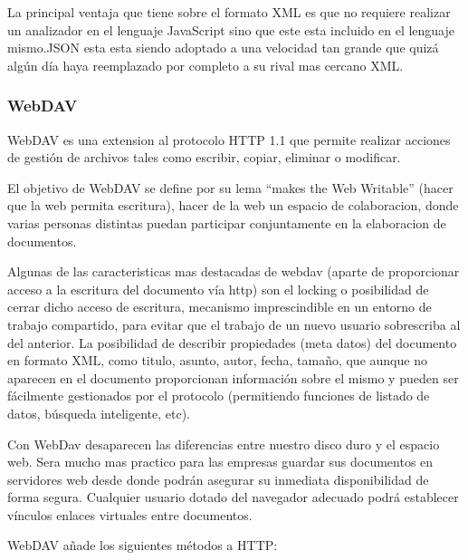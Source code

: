 La principal ventaja que tiene sobre el formato XML es que no requiere realizar un analizador en el lenguaje JavaScript sino que este esta incluido en el lenguaje mismo.\newline JSON esta esta siendo adoptado a una velocidad tan grande que quizá algún día haya reemplazado por completo a su rival mas cercano XML.


\subsubsection*{WebDAV}

WebDAV es una extension al protocolo HTTP 1.1 que permite realizar acciones de gestión de archivos tales como escribir, copiar, eliminar o modificar.

El objetivo de WebDAV se define por su lema ``makes the Web Writable'' (hacer que la web permita escritura), hacer de la web un espacio de colaboracion, donde varias personas distintas puedan participar conjuntamente en la elaboracion de documentos.

Algunas de las caracteristicas mas destacadas de webdav (aparte de proporcionar acceso a la escritura del documento vía http) son el locking o posibilidad de cerrar dicho acceso de escritura, mecanismo imprescindible en un entorno de trabajo compartido, para evitar que el trabajo de un nuevo usuario sobrescriba al del anterior. La posibilidad de describir propiedades (meta datos) del documento en formato XML, como titulo, asunto, autor, fecha, tamaño, que aunque no aparecen en el documento proporcionan información sobre el mismo y pueden ser fácilmente gestionados por el protocolo (permitiendo funciones de listado de datos, búsqueda inteligente, etc).

Con WebDav desaparecen las diferencias entre nuestro disco duro y el espacio web. Sera mucho mas practico para las empresas guardar sus documentos en servidores web desde donde podrán asegurar su inmediata disponibilidad de forma segura. Cualquier usuario dotado del navegador adecuado podrá establecer vínculos enlaces virtuales entre documentos.

WebDAV añade los siguientes métodos a HTTP:

